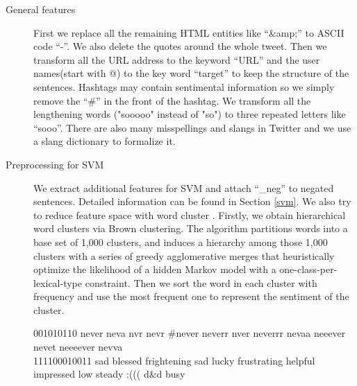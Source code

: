 \begin{description}
\item[General features] First we replace all the remaining HTML entities like ``\&amp;'' to ASCII code ``-''. We also delete the quotes around the whole tweet. Then we transform all the URL address to the keyword ``URL'' and the user names(start with @) to the key word ``target'' to keep the structure of the sentences. Hashtags may contain sentimental information so we simply remove the ``\#'' in the front of the hashtag. We transform all the lengthening words ("sooooo" instead of "so") to three repeated letters like ``sooo''. There are also many misspellings and slangs in Twitter and we use a slang dictionary to formalize it.


\item[Preprocessing for SVM] We extract additional features for SVM and attach ``\_neg'' to negated sentences. Detailed information can be found in Section \ref{svm}.  %
We also try to reduce feature space with word cluster \cite{Owoputi:2013}. Firstly, we obtain hierarchical word clusters via Brown clustering. The algorithm partitions words into a base set of 1,000 clusters, and induces a hierarchy among those 1,000 clusters with a series of greedy agglomerative merges that heuristically optimize the likelihood of a hidden Markov model with a one-class-per-lexical-type constraint. Then we sort the word in each cluster with frequency and use the most frequent one to represent the sentiment of the cluster.

001010110 never neva nvr nevr \#never neverr nver neverrr nevaa neeever nevet neeeever nevva
%
\\
111100010011 sad blessed frightening sad lucky frustrating helpful impressed low steady :((( d\&d busy


\end{description}
